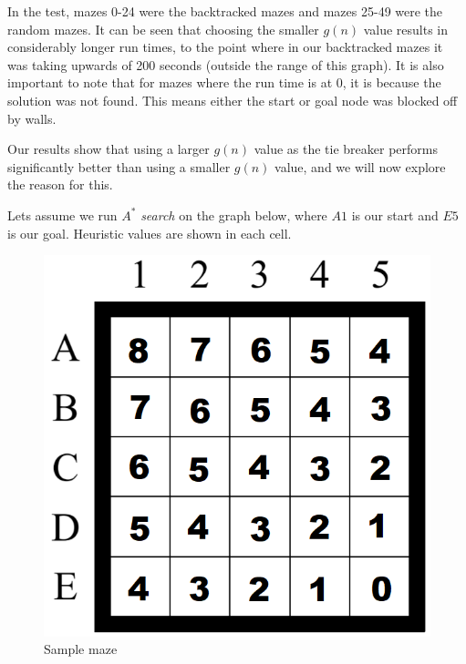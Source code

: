 In the test, mazes 0-24 were the backtracked mazes and mazes 25-49 were the random mazes. It can be seen that choosing the smaller $g(n)$ value results in considerably longer run times, to the point where in our backtracked mazes it was taking upwards of 200 seconds (outside the range of this graph). It is also important to note that for mazes where the run time is at 0, it is because the solution was not found. This means either the start or goal node was blocked off by walls.


Our results show that using a larger $g(n)$ value as the tie breaker performs significantly better than using a smaller $g(n)$ value, and we will now explore the reason for this. 


Lets assume we run $A^*$ \emph{search} on the graph below, where $A1$ is our start and $E5$ is our goal. Heuristic values are shown in each cell.

\begin{figure}[H]
  \centering
  \includegraphics[width=0.31\linewidth]{Report/Part2/g tie breaker/samplegraph.png}  
\caption{Sample maze}
\end{figure}


